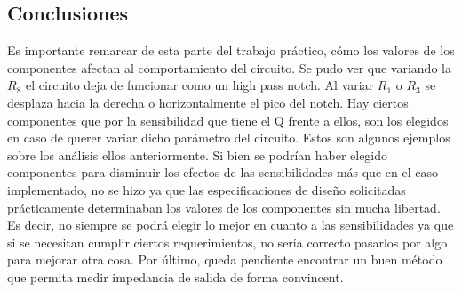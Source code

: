 \subsection{Conclusiones}
Es importante remarcar de esta parte del trabajo pr\'actico, c\'omo los valores de los componentes afectan al comportamiento del circuito. Se pudo ver que variando la $R_8$ el circuito deja de funcionar como un high pass notch. Al variar $R_1$ o $R_3$ se desplaza hacia la derecha o horizontalmente el pico del notch. Hay ciertos componentes que por la sensibilidad que tiene el Q frente a ellos, son los elegidos en caso de querer variar dicho par\'ametro del circuito. Estos son algunos ejemplos sobre los an\'alisis ellos anteriormente. Si bien se podr\'ian haber elegido componentes para disminuir los efectos de las sensibilidades m\'as que en el caso implementado, no se hizo ya que las especificaciones de dise\~no solicitadas pr\'acticamente determinaban los valores de los componentes sin mucha libertad. Es decir, no siempre se podr\'a elegir lo mejor en cuanto a las sensibilidades ya que si se necesitan cumplir ciertos requerimientos, no ser\'ia correcto pasarlos por algo para mejorar otra cosa. Por \'ultimo, queda pendiente encontrar un buen m\'etodo que permita medir impedancia de salida de forma convincent.
